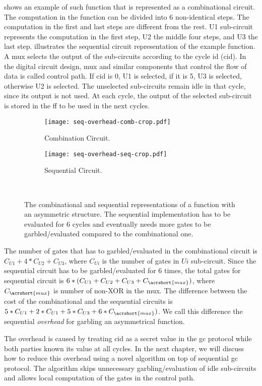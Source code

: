  shows an example of such function that is represented as a combinational circuit.
The computation in the function can be divided into 6 non-identical steps.
The computation in the first and last steps are different from the rest.
U1 sub-circuit represents the computation in the first step, U2 the middle four steps, and U3 the last step.
 illustrates the sequential circuit representation of the example function.
A \acrshort{mux} selects the output of the sub-circuits according to the cycle id (cid).
In the digital circuit design, \acrshort{mux} and similar components that control the flow of data is called control path.
If cid is 0, U1 is selected, if it is 5, U3 is selected, otherwise U2 is selected.
The unselected sub-circuits remain idle in that cycle, since its output is not used.
At each cycle, the output of the selected sub-circuit is stored in the \acrshort{ff} to be used in the next cycles.

\begin{figure}[h]
    \centering
    \begin{subfigure}[t]{0.7\textwidth}
        \texttt{[image: seq-overhead-comb-crop.pdf]}
        \caption{Combination Circuit.}\label{fig:seq-overhead-comb}
    \end{subfigure}
    \begin{subfigure}[t]{0.6\textwidth}
        \texttt{[image: seq-overhead-seq-crop.pdf]}
        \caption{Sequential Circuit.}\label{fig:seq-overhead-seq}
    \end{subfigure}\\
    \caption{The combinational and sequential representations of a function with an asymmetric structure.
    The sequential implementation has to be evaluated for 6 cycles and eventually needs more gates to be garbled/evaluated compared to the combinational one.}\label{fig:fig:seq-overhead-comb}
\end{figure}

The number of gates that has to garbled/evaluated in the combinational circuit is $C_{U1}+4*C_{U2}+C_{U3}$, where $C_{Ui}$ is the number of gates in $Ui$ sub-circuit.
Since the sequential circuit has to be garbled/evaluated for 6 times, the total gates for sequential circuit is $6*(C_{U1}+C_{U2}+C_{U3}+C_{\acrshort{mux}})$, where $C_{\acrshort{mux}}$ is number of non-XOR in the \acrshort{mux}.
The difference between the cost of the combinational and the sequential circuits is $5*C_{U1}+2*C_{U1}+5*C_{U3}+6*C_{\acrshort{mux}})$.
We call this difference the sequential \textit{overhead} for garbling an asymmetrical function.

The overhead is caused by treating cid as a secret value in the \acrshort{gc} protocol while both parties known its value at all cycles.
In the next chapter, we will discuss how to reduce this overhead using a novel algorithm on top of sequential \acrshort{gc} protocol.
The algorithm skips unnecessary garbling/evaluation of idle sub-circuits and allows local computation of the gates in the control path.
